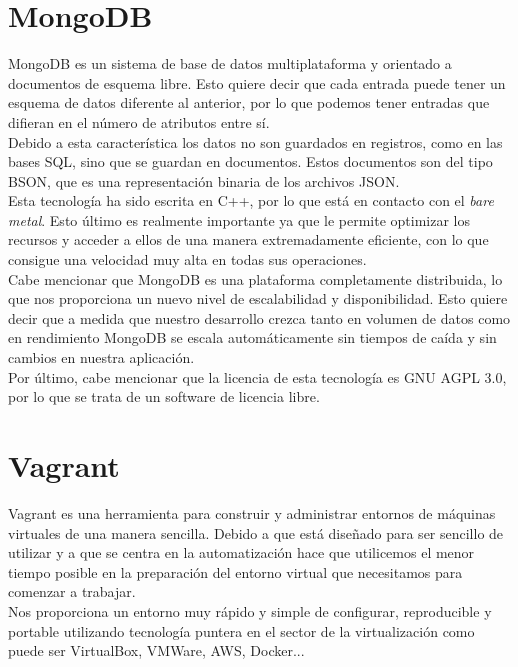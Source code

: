 \section{MongoDB}

MongoDB es un sistema de base de datos multiplataforma y orientado a documentos de esquema libre.
Esto quiere decir que cada entrada puede tener un esquema de datos diferente al anterior, por
lo que podemos tener entradas que difieran en el número de atributos entre sí.\\

Debido a esta característica los datos no son guardados en registros, como en las bases SQL, 
sino que se guardan en documentos. Estos documentos son del tipo BSON, que es una representación
binaria de los archivos JSON.\\

Esta tecnología ha sido escrita en C++, por lo que está en contacto con el \textit{bare metal}. Esto
último es realmente importante ya que le permite optimizar los recursos y acceder a ellos de una 
manera extremadamente eficiente, con lo que consigue una velocidad muy alta en todas sus operaciones.\\

Cabe mencionar que MongoDB es una plataforma completamente distribuida, lo que nos proporciona 
un nuevo nivel de escalabilidad y disponibilidad. Esto quiere decir que a medida que nuestro desarrollo
crezca tanto en volumen de datos como en rendimiento MongoDB se escala automáticamente sin tiempos
de caída y sin cambios en nuestra aplicación.\\

Por último, cabe mencionar que la licencia de esta tecnología es GNU AGPL 3.0, por lo que se trata de un software de licencia
libre.


\section{Vagrant}

Vagrant es una herramienta para construir y administrar entornos de máquinas virtuales de una 
manera sencilla. Debido a que está diseñado para ser sencillo de utilizar y a que se centra en 
la automatización hace que utilicemos el menor tiempo posible en la preparación del entorno virtual
que necesitamos para comenzar a trabajar.\\

Nos proporciona un entorno muy rápido y simple de configurar, reproducible y portable utilizando
tecnología puntera en el sector de la virtualización como puede ser VirtualBox, VMWare, AWS, Docker...\\

